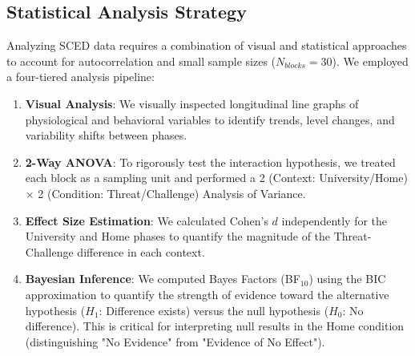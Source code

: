\subsection{Statistical Analysis Strategy}
Analyzing SCED data requires a combination of visual and statistical approaches to account for autocorrelation and small sample sizes ($N_{blocks}=30$). We employed a four-tiered analysis pipeline:

\begin{enumerate}
    \item \textbf{Visual Analysis}: We visually inspected longitudinal line graphs of physiological and behavioral variables to identify trends, level changes, and variability shifts between phases.
    \item \textbf{2-Way ANOVA}: To rigorously test the interaction hypothesis, we treated each block as a sampling unit and performed a 2 (Context: University/Home) $\times$ 2 (Condition: Threat/Challenge) Analysis of Variance.
    \item \textbf{Effect Size Estimation}: We calculated Cohen's $d$ independently for the University and Home phases to quantify the magnitude of the Threat-Challenge difference in each context.
    \item \textbf{Bayesian Inference}: We computed Bayes Factors (BF$_{10}$) using the BIC approximation to quantify the strength of evidence toward the alternative hypothesis ($H_1$: Difference exists) versus the null hypothesis ($H_0$: No difference). This is critical for interpreting null results in the Home condition (distinguishing "No Evidence" from "Evidence of No Effect").
\end{enumerate}
